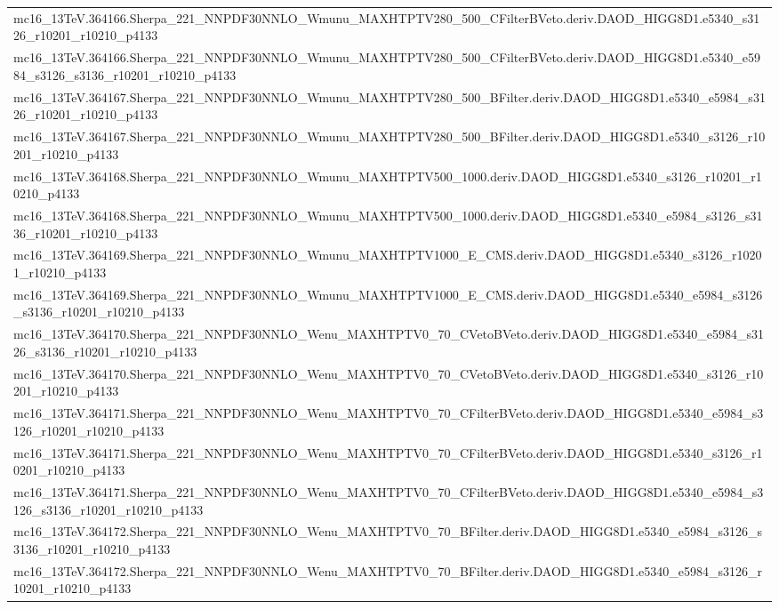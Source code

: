 \begin{adjustwidth}{-3em}{-3em}
\begin{longtable}{l}
mc16\_13TeV.364166.Sherpa\_221\_NNPDF30NNLO\_Wmunu\_MAXHTPTV280\_500\_CFilterBVeto.deriv.DAOD\_HIGG8D1.e5340\_s3126\_r10201\_r10210\_p4133 \\
mc16\_13TeV.364166.Sherpa\_221\_NNPDF30NNLO\_Wmunu\_MAXHTPTV280\_500\_CFilterBVeto.deriv.DAOD\_HIGG8D1.e5340\_e5984\_s3126\_s3136\_r10201\_r10210\_p4133 \\
mc16\_13TeV.364167.Sherpa\_221\_NNPDF30NNLO\_Wmunu\_MAXHTPTV280\_500\_BFilter.deriv.DAOD\_HIGG8D1.e5340\_e5984\_s3126\_r10201\_r10210\_p4133 \\
mc16\_13TeV.364167.Sherpa\_221\_NNPDF30NNLO\_Wmunu\_MAXHTPTV280\_500\_BFilter.deriv.DAOD\_HIGG8D1.e5340\_s3126\_r10201\_r10210\_p4133 \\
mc16\_13TeV.364168.Sherpa\_221\_NNPDF30NNLO\_Wmunu\_MAXHTPTV500\_1000.deriv.DAOD\_HIGG8D1.e5340\_s3126\_r10201\_r10210\_p4133 \\
mc16\_13TeV.364168.Sherpa\_221\_NNPDF30NNLO\_Wmunu\_MAXHTPTV500\_1000.deriv.DAOD\_HIGG8D1.e5340\_e5984\_s3126\_s3136\_r10201\_r10210\_p4133 \\
mc16\_13TeV.364169.Sherpa\_221\_NNPDF30NNLO\_Wmunu\_MAXHTPTV1000\_E\_CMS.deriv.DAOD\_HIGG8D1.e5340\_s3126\_r10201\_r10210\_p4133 \\
mc16\_13TeV.364169.Sherpa\_221\_NNPDF30NNLO\_Wmunu\_MAXHTPTV1000\_E\_CMS.deriv.DAOD\_HIGG8D1.e5340\_e5984\_s3126\_s3136\_r10201\_r10210\_p4133 \\
mc16\_13TeV.364170.Sherpa\_221\_NNPDF30NNLO\_Wenu\_MAXHTPTV0\_70\_CVetoBVeto.deriv.DAOD\_HIGG8D1.e5340\_e5984\_s3126\_s3136\_r10201\_r10210\_p4133 \\
mc16\_13TeV.364170.Sherpa\_221\_NNPDF30NNLO\_Wenu\_MAXHTPTV0\_70\_CVetoBVeto.deriv.DAOD\_HIGG8D1.e5340\_s3126\_r10201\_r10210\_p4133 \\
mc16\_13TeV.364171.Sherpa\_221\_NNPDF30NNLO\_Wenu\_MAXHTPTV0\_70\_CFilterBVeto.deriv.DAOD\_HIGG8D1.e5340\_e5984\_s3126\_r10201\_r10210\_p4133 \\
mc16\_13TeV.364171.Sherpa\_221\_NNPDF30NNLO\_Wenu\_MAXHTPTV0\_70\_CFilterBVeto.deriv.DAOD\_HIGG8D1.e5340\_s3126\_r10201\_r10210\_p4133 \\
mc16\_13TeV.364171.Sherpa\_221\_NNPDF30NNLO\_Wenu\_MAXHTPTV0\_70\_CFilterBVeto.deriv.DAOD\_HIGG8D1.e5340\_e5984\_s3126\_s3136\_r10201\_r10210\_p4133 \\
mc16\_13TeV.364172.Sherpa\_221\_NNPDF30NNLO\_Wenu\_MAXHTPTV0\_70\_BFilter.deriv.DAOD\_HIGG8D1.e5340\_e5984\_s3126\_s3136\_r10201\_r10210\_p4133 \\
mc16\_13TeV.364172.Sherpa\_221\_NNPDF30NNLO\_Wenu\_MAXHTPTV0\_70\_BFilter.deriv.DAOD\_HIGG8D1.e5340\_e5984\_s3126\_r10201\_r10210\_p4133 \\

\end{longtable}
\end{adjustwidth}
